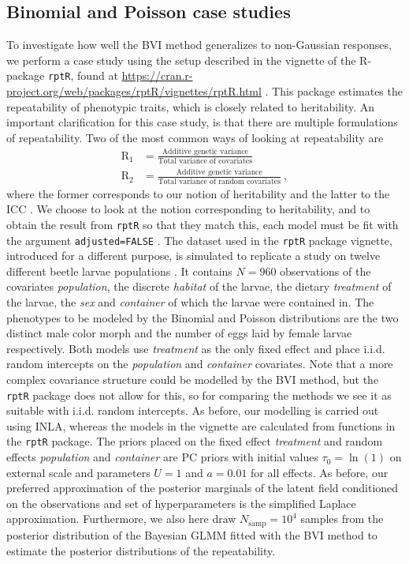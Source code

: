 \subsection{Binomial and Poisson case studies}
To investigate how well the BVI method generalizes to non-Gaussian responses, we perform a case study using the setup described in the vignette of the R-package \texttt{rptR}, found at \url{https://cran.r-project.org/web/packages/rptR/vignettes/rptR.html} \citep{Stoffel2017rptR}. This package estimates the repeatability of phenotypic traits, which is closely related to heritability. An important clarification for this case study, is that there are multiple formulations of repeatability. Two of the most common ways of looking at repeatability are
\begin{equation}
    \begin{aligned}
        \text{R}_1 &= \frac{\text{Additive genetic variance}}{\text{Total variance of covariates}} \\
        \text{R}_2 &= \frac{\text{Additive genetic variance}}{\text{Total variance of random covariates}} \ ,
    \end{aligned}
\end{equation}
where the former corresponds to our notion of heritability \citep{Stoffel2017rptR} and the latter to the ICC \citep{GLMM_book}. We choose to look at the notion corresponding to heritability, and to obtain the result from \texttt{rptR} so that they match this, each model must be fit with the argument \texttt{adjusted=FALSE} \citep{Stoffel2017rptR}. The dataset used in the \texttt{rptR} package vignette, introduced for a different purpose, is simulated to replicate a study on twelve different beetle larvae populations \citep{Stoffel2017rptR}. It contains $N=960$ observations of the covariates \textit{population}, the discrete \textit{habitat} of the larvae, the dietary \textit{treatment} of the larvae, the \textit{sex} and \textit{container} of which the larvae were contained in. The phenotypes to be modeled by the Binomial and Poisson distributions are the two distinct male color morph and the number of eggs laid by female larvae respectively. Both models use \textit{treatment} as the only fixed effect and place i.i.d. random intercepts on the \textit{population} and \textit{container} covariates. Note that a more complex covariance structure could be modelled by the BVI method, but the \texttt{rptR} package does not allow for this, so for comparing the methods we see it as suitable with i.i.d. random intercepts. As before, our modelling is carried out using INLA, whereas the models in the vignette are calculated from functions in the \texttt{rptR} package. The priors placed on the fixed effect \textit{treatment} and random effects \textit{population} and \textit{container} are PC priors with initial values $\tau_0=\ln(1)$ on external scale and parameters $U=1$ and $a=0.01$ for all effects. As before, our preferred approximation of the posterior marginals of the latent field conditioned on the observations and set of hyperparameters is the simplified Laplace approximation. Furthermore, we also here draw $N_{\text{samp}}=10^4$ samples from the posterior distribution of the Bayesian GLMM fitted with the BVI method to estimate the posterior distributions of the repeatability. 


